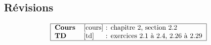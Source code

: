 \subsection{Révisions}

$$\begin{tabular}{|ll@{ : }l|}
\hline
\textbf{Cours} & \cite{cours} & chapitre 2, section 2.2 \\
\textbf{TD}    & \cite{td}    & exercices 2.1 à 2.4, 2.26 à 2.29 \\
\hline
\end{tabular}$$
